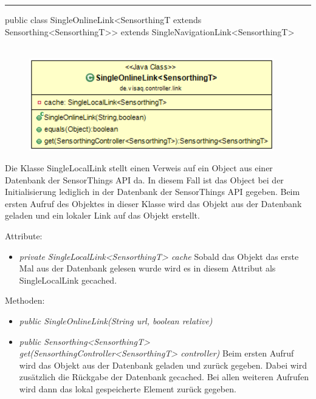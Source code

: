 \rule{\textwidth}{0.4pt}
public class SingleOnlineLink<SensorthingT extends Sensorthing<SensorthingT>> extends SingleNavigationLink<SensorthingT>
\\\\
\begin{minipage}{0.4\textwidth}
    \begin{figure}[H]
        {\centering\includegraphics[width=0.95\textwidth]{media/backend/controller/classes/SingleOnlineLink.png}}
    \end{figure}
    \end{minipage} \hfill
\begin{minipage}{0.6\textwidth}
    Die Klasse SingleLocalLink stellt einen Verweis auf ein Object aus einer Datenbank der \gls{SensorThings API} da.
    In diesem Fall ist das Object bei der Initialisierung lediglich in der Datenbank der \gls{SensorThings API} gegeben.
    Beim ersten Aufruf des Objektes in dieser Klasse wird das Objekt aus der Datenbank geladen und ein lokaler Link auf das Objekt erstellt.
\end{minipage}

Attribute:
\begin{itemize}
    \item \emph{private SingleLocalLink<SensorthingT> cache} Sobald das Objekt das erste Mal aus der Datenbank gelesen wurde wird es in diesem Attribut als SingleLocalLink gecached.
\end{itemize}
Methoden:
\begin{itemize}
    \item \emph{public SingleOnlineLink(String url, boolean relative)}
    \relativeDescription
    \item \emph{public Sensorthing<SensorthingT> get(SensorthingController<SensorthingT> controller)}
    Beim ersten Aufruf wird das Objekt aus der Datenbank geladen und zurück gegeben.
    Dabei wird zusätzlich die Rückgabe der Datenbank gecached.
    Bei allen weiteren Aufrufen wird dann das lokal gespeicherte Element zurück gegeben.
\end{itemize}

